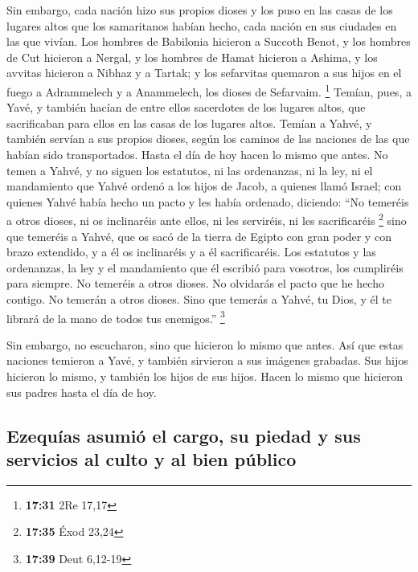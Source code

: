  Sin embargo, cada nación hizo sus propios dioses y los
puso en las casas de los lugares altos que los samaritanos habían hecho,
cada nación en sus ciudades en las que vivían.  Los
hombres de Babilonia hicieron a Succoth Benot, y los hombres de Cut
hicieron a Nergal, y los hombres de Hamat hicieron a Ashima,
 y los avvitas hicieron a Nibhaz y a Tartak; y los
sefarvitas quemaron a sus hijos en el fuego a Adrammelech y a
Anammelech, los dioses de Sefarvaim. \footnote{\textbf{17:31} 2Re 17,17}
 Temían, pues, a Yavé, y también hacían de entre ellos
sacerdotes de los lugares altos, que sacrificaban para ellos en las
casas de los lugares altos.  Temían a Yahvé, y también
servían a sus propios dioses, según los caminos de las naciones de las
que habían sido transportados.  Hasta el día de hoy hacen
lo mismo que antes. No temen a Yahvé, y no siguen los estatutos, ni las
ordenanzas, ni la ley, ni el mandamiento que Yahvé ordenó a los hijos de
Jacob, a quienes llamó Israel;  con quienes Yahvé había
hecho un pacto y les había ordenado, diciendo: ``No temeréis a otros
dioses, ni os inclinaréis ante ellos, ni les serviréis, ni les
sacrificaréis \footnote{\textbf{17:35} Éxod 23,24}  sino
que temeréis a Yahvé, que os sacó de la tierra de Egipto con gran poder
y con brazo extendido, y a él os inclinaréis y a él sacrificaréis.
 Los estatutos y las ordenanzas, la ley y el mandamiento
que él escribió para vosotros, los cumpliréis para siempre. No temeréis
a otros dioses.  No olvidarás el pacto que he hecho
contigo. No temerán a otros dioses.  Sino que temerás a
Yahvé, tu Dios, y él te librará de la mano de todos tus enemigos.''
\footnote{\textbf{17:39} Deut 6,12-19}

 Sin embargo, no escucharon, sino que hicieron lo mismo
que antes.  Así que estas naciones temieron a Yavé, y
también sirvieron a sus imágenes grabadas. Sus hijos hicieron lo mismo,
y también los hijos de sus hijos. Hacen lo mismo que hicieron sus padres
hasta el día de hoy.

\hypertarget{ezequuxedas-asumiuxf3-el-cargo-su-piedad-y-sus-servicios-al-culto-y-al-bien-puxfablico}{%
\subsection{Ezequías asumió el cargo, su piedad y sus servicios al culto
y al bien
público}\label{ezequuxedas-asumiuxf3-el-cargo-su-piedad-y-sus-servicios-al-culto-y-al-bien-puxfablico}}

